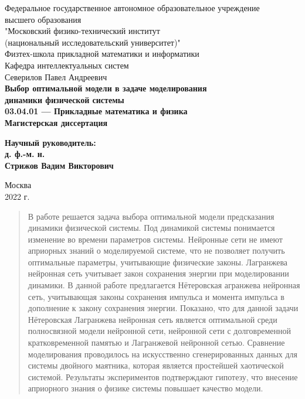 \documentclass[12pt]{article}
\begin{document}
{
\renewcommand{\baselinestretch}{1}
\thispagestyle{empty}
\begin{center}
    
        Федеральное государственное автономное образовательное учреждение\\
        высшего образования\\
        "Московский физико-технический институт\\
        {\rm(национальный исследовательский университет)}"\\
        Физтех-школа прикладной математики и информатики\\
        Кафедра интеллектуальных систем\\[35mm]
    \rm\large
        Северилов Павел Андреевич\\[10mm]
    \bf\Large
        Выбор оптимальной модели в задаче моделирования\\
        динамики физической системы\\[10mm]
    \rm\normalsize
        03.04.01 --- Прикладные математика и физика\\[10mm]
    \sc
        Магистерская диссертация\\[30mm]
\end{center}
\hfill\parbox{80mm}{
    \begin{flushleft}
    \bf
        Научный руководитель:\\
    \rm
        д. ф.-м. н.\\
        Стрижов Вадим Викторович\\[3cm]
    \end{flushleft}
}
\begin{center}
    Москва\\
    2022 г.
\end{center}
}

\newpage
\tableofcontents

\newpage
\begin{abstract}
	В работе решается задача выбора оптимальной модели предсказания динамики физической системы. Под динамикой системы понимается изменение во времени параметров системы. Нейронные сети не имеют априорных знаний о моделируемой системе, что не позволяет получить оптимальные параметры, учитывающие физические законы. Лагранжева нейронная сеть учитывает закон сохранения энергии при моделировании динамики. В данной работе предлагается Нётеровская агранжева нейронная сеть, учитывающая законы сохранения импульса и момента импульса в дополнение к закону сохранения энергии. Показано, что для данной задачи Нётеровская Лагранжева нейронная сеть является оптимальной среди полносвязной модели нейронной сети, нейронной сети с долговременной кратковременной памятью и Лагранжевой нейронной сетью. Сравнение моделирования проводилось на искусственно сгенерированных данных для системы двойного маятника, которая является простейшей хаотической системой. Результаты экспериментов подтверждают гипотезу, что внесение априорного знания о физике системы повышает качество модели.

\end{abstract}
\end{document}
